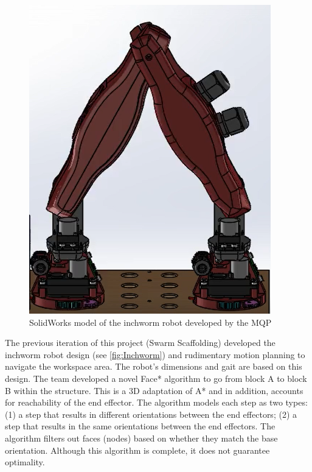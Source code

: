 \begin{figure}[ht]
    \includegraphics[width=\linewidth]{figures/InchwormPic.PNG}
    \caption{SolidWorks model of the inchworm robot developed by the MQP \cite{PastMQP}}
    \label{fig:Inchworm}
\end{figure} 

The previous iteration of this project (Swarm Scaffolding) developed the inchworm robot design (see \autoref{fig:Inchworm}) and rudimentary motion planning to navigate the workspace area. The robot’s dimensions and gait are based on this design. The team developed a novel Face* algorithm to go from block A to block B within the structure. This is a 3D adaptation of A* and in addition, accounts for reachability of the end effector. The algorithm models each step as two types: (1) a step that results in different orientations between the end effectors; (2) a step that results in the same orientations between the end effectors. The algorithm filters out faces (nodes) based on whether they match the base orientation. Although this algorithm is complete, it does not guarantee optimality\cite{PastMQP}.

